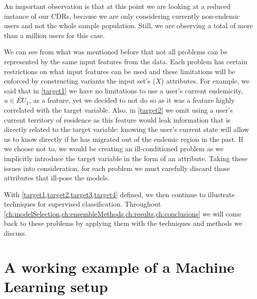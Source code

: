 An important observation is that at this point we are looking at a reduced instance of our CDRs, because we are only considering currently non-endemic users and not the whole sample population.
Still, we are observing a total of more than a million users for this case.






We can see from what was mentioned before that not all problems can be represented by the same input features from the data.
Each problem has certain restrictions on what input features can be used and these limitations will be enforced by constructing variants the input set's ($X$) attributes.
For example, we said that in \cref{target1} we have no limitations to use a user's current endemicity, $u \in EU_{1}$, as a feature, yet we decided to not do so as it was a feature highly correlated with the target variable.
Also, in \cref{target2} we omit using a user's current territory of residence as this feature would leak information that is directly related to the target variable: knowing the user's current state will allow us to know directly if he has migrated out of the endemic region in the past.
If we choose not to, we would be creating an ill-conditioned problem as we implicitly introduce the target variable in the form of an attribute.
Taking these issues into consideration, for each problem we must carefully discard those attributes that ill-pose the models.


With \cref{target1,target2,target3,target4} defined, we then continue to illustrate techniques for supervised classification.
Throughout \cref{ch:modelSelection,ch:ensembleMethods,ch:results,ch:conclusions} we will come back to these problems by applying them with the techniques and methods we discuss.


\section{A working example of a Machine Learning setup}\label{section-example}

